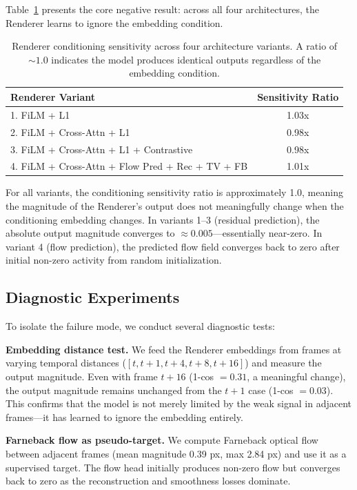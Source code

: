 \documentclass[10pt,twocolumn,letterpaper]{article}
\begin{document}
Table~\ref{tab:renderer} presents the core negative result: across all four
architectures, the Renderer learns to ignore the embedding condition.

\begin{table}[h]
\centering
\caption{Renderer conditioning sensitivity across four architecture
variants. A ratio of $\sim\!1.0$ indicates the model produces identical
outputs regardless of the embedding condition.}
\label{tab:renderer}
\begin{tabular}{lc}
\toprule
\textbf{Renderer Variant} & \textbf{Sensitivity Ratio} \\
\midrule
1. FiLM + L1                                  & 1.03x \\
2. FiLM + Cross-Attn + L1                     & 0.98x \\
3. FiLM + Cross-Attn + L1 + Contrastive       & 0.98x \\
4. FiLM + Cross-Attn + Flow Pred + Rec + TV + FB & 1.01x \\
\bottomrule
\end{tabular}
\end{table}

For all variants, the conditioning sensitivity ratio is approximately 1.0,
meaning the magnitude of the Renderer's output does not meaningfully change
when the conditioning embedding changes. In variants 1--3 (residual
prediction), the absolute output magnitude converges to $\approx 0.005$---essentially
near-zero. In variant 4 (flow prediction), the predicted flow field
converges back to zero after initial non-zero activity from random
initialization.

\subsection{Diagnostic Experiments}

To isolate the failure mode, we conduct several diagnostic tests:

\textbf{Embedding distance test.} We feed the Renderer embeddings from
frames at varying temporal distances ($[t, t+1, t+4, t+8, t+16]$) and
measure the output magnitude. Even with frame $t+16$ (1-cos $=0.31$, a
meaningful change), the output magnitude remains unchanged from the $t+1$
case (1-cos $=0.03$). This confirms that the model is not merely limited
by the weak signal in adjacent frames---it has learned to ignore the
embedding entirely.

\textbf{Farneback flow as pseudo-target.} We compute Farneback optical flow
between adjacent frames (mean magnitude 0.39 px, max 2.84 px) and use it
as a supervised target. The flow head initially produces non-zero flow but
converges back to zero as the reconstruction and smoothness losses dominate.
\end{document}
